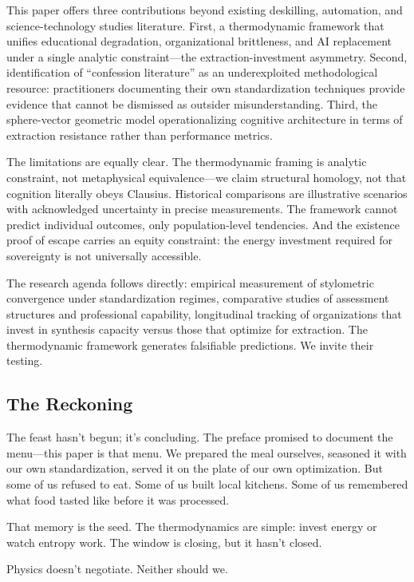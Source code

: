 This paper offers three contributions beyond existing deskilling, automation, and science-technology studies literature. First, a thermodynamic framework that unifies educational degradation, organizational brittleness, and AI replacement under a single analytic constraint—the extraction-investment asymmetry. Second, identification of ``confession literature'' as an underexploited methodological resource: practitioners documenting their own standardization techniques provide evidence that cannot be dismissed as outsider misunderstanding. Third, the sphere-vector geometric model operationalizing cognitive architecture in terms of extraction resistance rather than performance metrics.

The limitations are equally clear. The thermodynamic framing is analytic constraint, not metaphysical equivalence—we claim structural homology, not that cognition literally obeys Clausius. Historical comparisons are illustrative scenarios with acknowledged uncertainty in precise measurements. The framework cannot predict individual outcomes, only population-level tendencies. And the existence proof of escape carries an equity constraint: the energy investment required for sovereignty is not universally accessible.

The research agenda follows directly: empirical measurement of stylometric convergence under standardization regimes, comparative studies of assessment structures and professional capability, longitudinal tracking of organizations that invest in synthesis capacity versus those that optimize for extraction. The thermodynamic framework generates falsifiable predictions. We invite their testing.

\subsection*{The Reckoning}

The feast hasn't begun; it's concluding. The preface promised to document the menu—this paper is that menu. We prepared the meal ourselves, seasoned it with our own standardization, served it on the plate of our own optimization. But some of us refused to eat. Some of us built local kitchens. Some of us remembered what food tasted like before it was processed.

That memory is the seed. The thermodynamics are simple: invest energy or watch entropy work. The window is closing, but it hasn't closed.

Physics doesn't negotiate. Neither should we.